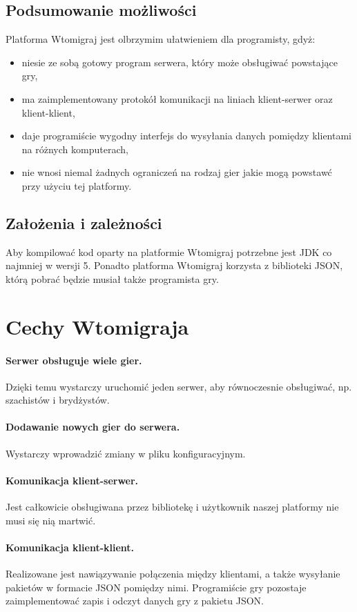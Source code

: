 \documentclass[a4paper, 12pt]{article}
\begin{document}
\subsection[Podsumowanie możliwości]{Podsumowanie możliwości}
Platforma Wtomigraj jest olbrzymim ułatwieniem dla programisty, gdyż:
\begin{itemize}
 \item niesie ze sobą gotowy program serwera, który może obsługiwać powstające gry,
 \item ma zaimplementowany protokół komunikacji na liniach klient-serwer oraz klient-klient,
 \item daje programiście wygodny interfejs do wysyłania danych pomiędzy klientami na różnych komputerach,
 \item nie wnosi niemal żadnych ograniczeń na rodzaj gier jakie mogą powstawć przy użyciu tej platformy.
\end{itemize}

\subsection[Założenia i zależności]{Założenia i zależności}
Aby kompilować kod oparty na platformie Wtomigraj potrzebne jest JDK co najmniej w wersji 5. Ponadto platforma Wtomigraj korzysta z biblioteki JSON, którą pobrać będzie musiał także programista gry.

\section[Cechy Wtomigraja]{Cechy Wtomigraja}
\paragraph{Serwer obsługuje wiele gier.} Dzięki temu wystarczy uruchomić jeden serwer, aby równoczesnie obsługiwać, np. szachistów i brydżystów.
\paragraph{Dodawanie nowych gier do serwera.} Wystarczy wprowadzić zmiany w pliku konfiguracyjnym.
\paragraph{Komunikacja klient-serwer.} Jest całkowicie obsługiwana przez bibliotekę i użytkownik naszej platformy nie musi się nią martwić.
\paragraph{Komunikacja klient-klient.} Realizowane jest nawiązywanie połączenia między klientami, a także wysyłanie pakietów w formacie JSON pomiędzy nimi. Programiście gry pozostaje zaimplementować zapis i odczyt danych gry z pakietu JSON.
\end{document}
